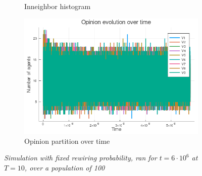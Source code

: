 \documentclass[12pt,openright,twoside]{book}
\begin{document}
\begin{appendices}
\begin{figure}[!htb]
\begin{subfigure}{0.47\linewidth}
    \caption{Inneighbor histogram}
\end{subfigure}
\begin{subfigure}{0.47\linewidth}
    \includegraphics[width=\linewidth]{figures/2_2_t10/vote_evolution.png}
    \caption{Opinion partition over time}
\end{subfigure}
\caption{\textit{{\small Simulation with fixed rewiring probability, ran for $t=6\cdot 10^6$ at $T=10$, over a population of 100}}}
\label{2_2_t10}
\end{figure}


\end{appendices}
\end{document}
